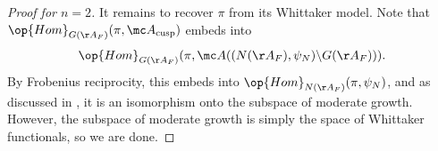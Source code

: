 \documentclass[../notes.tex]{subfiles}
\begin{document}
\begin{proof}[Proof for $n=2$]
	It remains to recover $\pi$ from its Whittaker model. Note that $\op{Hom}_{G(\AA_F)}(\pi,\mc A_{\mathrm{cusp}})$ embeds into
	\[\op{Hom}_{G(\AA_F)}(\pi,\mc A((N(\AA_F),\psi_N)\backslash G(\AA_F))).\]
	By Frobenius reciprocity, this embeds into $\op{Hom}_{N(\AA_F)}(\pi,\psi_N)$, and as discussed in , it is an isomorphism onto the subspace of moderate growth. However, the subspace of moderate growth is simply the space of Whittaker functionals, so we are done.
\end{proof}
\end{document}
